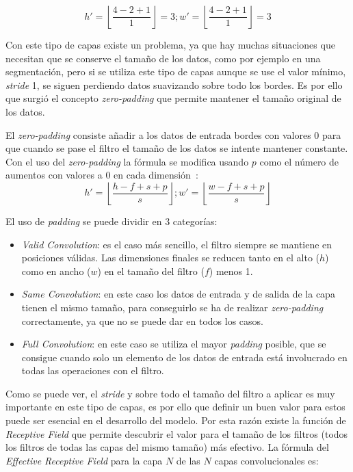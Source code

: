 \begin{equation}
h'=\left \lfloor \frac{4-2+1}{1} \right \rfloor = 3; w'= \left \lfloor \frac{4-2+1}{1} \right \rfloor=3
\end{equation}

Con este tipo de capas existe un problema, ya que hay muchas situaciones que necesitan que se conserve el tamaño de los datos, como por ejemplo en una segmentación, pero si se utiliza este tipo de capas aunque se use el valor mínimo, \textit{stride} 1, se siguen perdiendo datos suavizando sobre todo los bordes. Es por ello que surgió el concepto \textit{zero-padding} que permite mantener el tamaño original de los datos.

El \textit{zero-padding} consiste añadir a los datos de entrada bordes con valores 0 para que cuando se pase el filtro el tamaño de los datos se intente mantener constante. Con el uso del \textit{zero-padding} la fórmula se modifica usando $p$ como el número de aumentos con valores a 0 en cada dimensión~\cite{zeropadding}:
\begin{equation}
h'=\left \lfloor \frac{h-f+s+p}{s} \right \rfloor; w'= \left \lfloor \frac{w-f+s+p}{s} \right \rfloor
\end{equation}

El uso de \textit{padding} se puede dividir en 3 categorías:
\begin{itemize}
	\item \textit{Valid Convolution}: es el caso más sencillo, el filtro siempre se mantiene en posiciones válidas. Las dimensiones finales se reducen tanto en el alto ($h$) como en ancho ($w$) en el tamaño del filtro ($f$) menos 1.
	\item \textit{Same Convolution}: en este caso los datos de entrada y de salida de la capa tienen el mismo tamaño, para conseguirlo se ha de realizar \textit{zero-padding} correctamente, ya que no se puede dar en todos los casos.
	\item \textit{Full Convolution}: en este caso se utiliza el mayor \textit{padding} posible, que se consigue cuando solo un elemento de los datos de entrada está involucrado en todas las operaciones con el filtro.
\end{itemize}

Como se puede ver, el \textit{stride} y sobre todo el tamaño del filtro a aplicar es muy importante en este tipo de capas, es por ello que definir un buen valor para estos puede ser esencial en el desarrollo del modelo. Por esta razón existe la función de \textit{Receptive Field} que permite descubrir el valor para el tamaño de los filtros (todos los filtros de todas las capas del mismo tamaño) más efectivo. La fórmula del \textit{Effective Receptive Field} para la capa $N$ de las $N$ capas convolucionales es:

